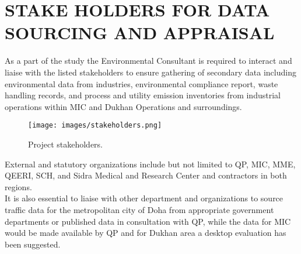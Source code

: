 \chapter{STAKE HOLDERS FOR DATA SOURCING AND APPRAISAL}

As a part of the study the Environmental Consultant is required to interact and liaise with the listed stakeholders to ensure gathering of secondary data including environmental data from industries, environmental compliance report, waste handling records, and process and utility emission inventories from industrial operations within MIC and Dukhan Operations and surroundings.

\begin{figure}[H]
\centering
\texttt{[image: images/stakeholders.png]} 
\caption{Project stakeholders.}
\label{fig:stakeholders}
\end{figure}
%

External and statutory organizations include but not limited to QP, MIC, MME, QEERI, SCH, and Sidra Medical and Research Center and contractors in both regions.\\

It is also essential to liaise with other department and organizations to source traffic data for the metropolitan city of Doha from appropriate government departments or published data in consultation with QP, while the data for MIC would be made available by QP and for Dukhan area a desktop evaluation has been suggested.
